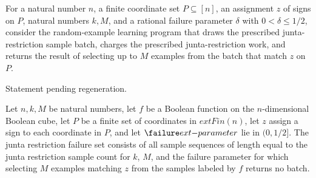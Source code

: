 \begin{definition}
\label{FABL.juntaRestrictionSampleProgram}
\leanok
{}
For a natural number $n$, a finite coordinate set $P\subseteq[n]$, an assignment $z$ of
signs on $P$, natural numbers $k,M$, and a rational failure parameter $\delta$ with
$0<\delta\leq 1/2$, consider the random-example learning program that draws the
prescribed junta-restriction sample batch, charges the prescribed junta-restriction
work, and returns the result of selecting up to $M$ examples from the batch that match
$z$ on $P$.
\end{definition}

\begin{theorem}
\label{FABL.runWithCost_juntaRestrictionSampleProgram}
\leanok
{}
Statement pending regeneration.
\end{theorem}

\begin{definition}
\label{FABL.juntaRestrictionFailureSet}
\leanok
{}
Let $n,k,M$ be natural numbers, let $f$ be a Boolean function on the $n$-dimensional
Boolean cube, let $P$ be a finite set of coordinates in $	ext{Fin}(n)$, let $z$ assign a
sign to each coordinate in $P$, and let $\failure	ext{-parameter}$ lie in $(0,1/2]$. The
junta restriction failure set consists of all sample sequences of length equal to the
junta restriction sample count for $k$, $M$, and the failure parameter for which
selecting $M$ examples matching $z$ from the samples labeled by $f$ returns no batch.
\end{definition}

